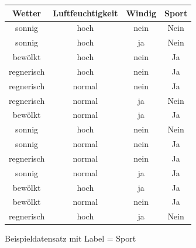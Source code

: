 \begin{figure}[h!]
    \centering
    \begin{subfigure}[b]{0.45\textwidth}
        \centering
        \small
        \begin{tabular}{|c|c|c|c|}
        \hline
        \rowcolor[HTML]{C0C0C0}
        Wetter & Luftfeuchtigkeit & Windig & Sport \\ \hline
        sonnig & hoch             & nein   & Nein  \\ \hline
        sonnig & hoch             & ja     & Nein  \\ \hline
        bewölkt & hoch            & nein   & Ja    \\ \hline
        regnerisch & hoch         & nein   & Ja    \\ \hline
        regnerisch & normal       & nein   & Ja    \\ \hline
        regnerisch & normal       & ja     & Nein  \\ \hline
        bewölkt & normal          & ja     & Ja    \\ \hline
        sonnig & hoch             & nein   & Nein  \\ \hline
        sonnig & normal           & nein   & Ja    \\ \hline
        regnerisch & normal       & nein   & Ja    \\ \hline
        sonnig & normal           & ja     & Ja    \\ \hline
        bewölkt & hoch            & ja     & Ja    \\ \hline
        bewölkt & normal          & nein   & Ja    \\ \hline
        regnerisch & hoch         & ja     & Nein  \\ \hline
        \end{tabular}
        \caption{Beispieldatensatz mit Label = Sport}
        \label{tab:sport}
    \end{subfigure}
    \hspace{0.05\textwidth}
    \begin{subfigure}[b]{0.45\textwidth}
        \centering

\end{subfigure}
\end{figure}
